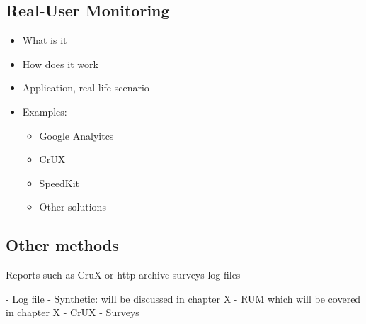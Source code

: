 \subsection{Real-User Monitoring}

\begin{itemize}
    \item What is it
    \item How does it work
    \item Application, real life scenario
    \item Examples:
    \begin{itemize}
        \item Google Analyitcs
        \item CrUX
        \item SpeedKit
        \item Other solutions
    \end{itemize}
\end{itemize}










\subsection{Other methods}

Reports such as CruX or http archive
surveys
log files



- Log file
- Synthetic: will be discussed in chapter X
- RUM which will be covered in chapter X
- CrUX
- Surveys







